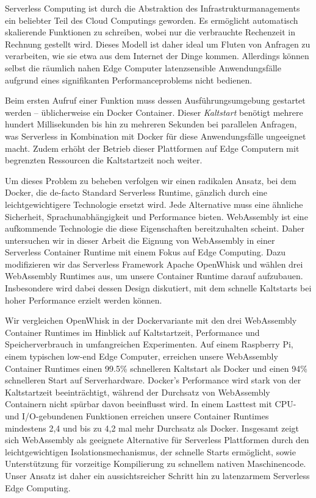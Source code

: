 \documentclass[draft, final, x11names, svgnames]{template/vutinfth} %
\begin{document}
\begin{kurzfassung}

Serverless Computing ist durch die Abstraktion des Infrastrukturmanagements ein beliebter Teil des Cloud Computings geworden. Es ermöglicht automatisch skalierende Funktionen zu schreiben, wobei nur die verbrauchte Rechenzeit in Rechnung gestellt wird. Dieses Modell ist daher ideal um Fluten von Anfragen zu verarbeiten, wie sie etwa aus dem Internet der Dinge kommen. Allerdings können selbst die räumlich nahen Edge Computer latenzsensible Anwendungsfälle aufgrund eines signifikanten Performanceproblems nicht bedienen.

Beim ersten Aufruf einer Funktion muss dessen Ausführungsumgebung gestartet werden -- üblicherweise ein Docker Container. Dieser \emph{Kaltstart} benötigt mehrere hundert Millisekunden bis hin zu mehreren Sekunden bei parallelen Anfragen, was Serverless in Kombination mit Docker für diese Anwendungsfälle ungeeignet macht. Zudem erhöht der Betrieb dieser Plattformen auf Edge Computern mit begrenzten Ressourcen die Kaltstartzeit noch weiter.

Um dieses Problem zu beheben verfolgen wir einen radikalen Ansatz, bei dem Docker, die de-facto Standard Serverless Runtime, gänzlich durch eine leichtgewichtigere Technologie ersetzt wird. Jede Alternative muss eine ähnliche Sicherheit, Sprachunabhängigkeit und Performance bieten. WebAssembly ist eine aufkommende Technologie die diese Eigenschaften bereitzuhalten scheint. Daher untersuchen wir in dieser Arbeit die Eignung von WebAssembly in einer Serverless Container Runtime mit einem Fokus auf Edge Computing. Dazu modifizieren wir das Serverless Framework Apache OpenWhisk und wählen drei WebAssembly Runtimes aus, um unsere Container Runtime darauf aufzubauen. Insbesondere wird dabei dessen Design diskutiert, mit dem schnelle Kaltstarts bei hoher Performance erzielt werden können.

Wir vergleichen OpenWhisk in der Dockervariante mit den drei WebAssembly Container Runtimes im Hinblick auf Kaltstartzeit, Performance und Speicherverbrauch in umfangreichen Experimenten. Auf einem Raspberry Pi, einem typischen low-end Edge Computer, erreichen unsere WebAssembly Container Runtimes einen 99.5\% schnelleren Kaltstart als Docker und einen 94\% schnelleren Start auf Serverhardware. Docker's Performance wird stark von der Kaltstartzeit beeinträchtigt, während der Durchsatz von WebAssembly Containern nicht spürbar davon beeinflusst wird. In einem Lasttest mit CPU- und I/O-gebundenen Funktionen erreichen unsere Container Runtimes mindestens 2,4 und bis zu 4,2 mal mehr Durchsatz als Docker. Insgesamt zeigt sich WebAssembly als geeignete Alternative für Serverless Plattformen durch den leichtgewichtigen Isolationsmechanismus, der schnelle Starts ermöglicht, sowie Unterstützung für vorzeitige Kompilierung zu schnellem nativen Maschinencode. Unser Ansatz ist daher ein aussichtsreicher Schritt hin zu latenzarmem Serverless Edge Computing.

\end{kurzfassung}
\end{document}
